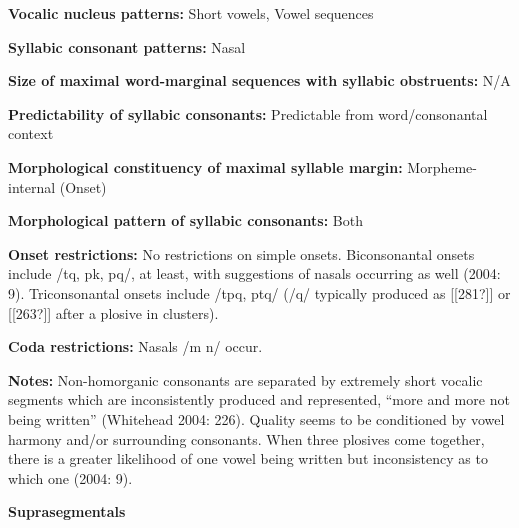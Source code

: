 \begin{styleBody}
\textbf{Vocalic nucleus patterns:} Short vowels, Vowel sequences
\end{styleBody}

\begin{styleBody}
\textbf{Syllabic consonant patterns:} Nasal
\end{styleBody}

\begin{styleBody}
\textbf{Size of maximal word{}-marginal sequences with syllabic obstruents:} N/A
\end{styleBody}

\begin{styleBody}
\textbf{Predictability of syllabic consonants:} Predictable from word/consonantal context
\end{styleBody}

\begin{styleBody}
\textbf{Morphological constituency of maximal syllable margin:} Morpheme-internal (Onset)
\end{styleBody}

\begin{styleBody}
\textbf{Morphological pattern of syllabic consonants:} Both
\end{styleBody}

\begin{styleBody}
\textbf{Onset restrictions: }No restrictions on simple onsets. Biconsonantal onsets include /tq, pk, pq/, at least, with suggestions of nasals occurring as well (2004: 9). Triconsonantal onsets include /tpq, ptq/ (/q/ typically produced as [[281?]] or [[263?]] after a plosive in clusters). 
\end{styleBody}

\begin{styleBody}
\textbf{Coda restrictions: }Nasals /m n/ occur.
\end{styleBody}

\begin{styleBody}
\textbf{Notes: }Non-homorganic consonants are separated by extremely short vocalic segments which are inconsistently produced and represented, “more and more not being written” (Whitehead 2004: 226). Quality seems to be conditioned by vowel harmony and/or surrounding consonants. When three plosives come together, there is a greater likelihood of one vowel being written but inconsistency as to which one (2004: 9).
\end{styleBody}

\begin{styleBody}
\textbf{Suprasegmentals}
\end{styleBody}

